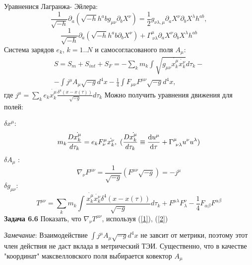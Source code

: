 \documentclass[a4paper]{article}
\begin{document}
Уравненися Лагранжа- Эйлера:
\begin{equation}
\frac{1}{\sqrt{-h}} \partial_a (\sqrt{-h} h^ab g_{\mu \nu} \partial_b X^\nu) =\frac{1}{2} g_{\nu \lambda, \mu} \partial_a X^\nu \partial_b X^\lambda h^{ab},
\end{equation}
\begin{equation}
\frac{1}{\sqrt{-h}} \partial_a (\sqrt{-h} h^ab  \partial_b X^\nu) + \Gamma^{\mu}_{{~} \nu \lambda} \partial_a X^\nu \partial_b X^\lambda h^{ab} 
\end{equation}
Система зарядов $e_k$, $k=1..N$ и самосогласованого поля $A_\mu$:
\begin{align}
S  = S_m + S_{int} +S_F = - \sum_k m_k \int \sqrt{g_{\mu \nu} \dot{x^\mu_k} \dot{x^\nu_k}} d\tau_k - \\
  \nonumber
- \int j^\mu A_\mu \sqrt{-g} d^4x - \frac{1}{4} \int F_{\mu \nu} F^{\mu \nu} \sqrt{-g} d^4 x,
\end{align}
где $j^\mu = \sum_k e_k \dot{x_k^\mu} \frac{\delta^4(x - x(\tau))}{\sqrt{-g}} d\tau_k$ Можно получить уравнения движения для полей:
\par 
$\delta x^\mu$: 
\begin{equation}
\label{1}
m_k \frac{D \dot{x^\mu_k}}{d\tau_k} = e_k F^\mu_\nu \dot{x^\nu_k},  {~} (\frac{D \dot{x^\mu_k}}{d\tau_k} \equiv \dv{u^\mu}{\tau} + \Gamma^{\mu}_{{~} \nu \lambda} u^{\nu} u^{\lambda})
\end{equation}
$\delta A_\mu$ :
\begin{equation}
\nabla_\nu F^{\mu \nu} = \frac{1}{\sqrt{-g}} (F^{\mu \nu} \sqrt{-g}) = - j^\mu  \label{2}
\end{equation}
$\delta g_{\mu \nu}:$
\begin{equation}
T^{\mu \nu} =\sum_k m_k \int\frac{\dot{x^\mu_k} \dot{x^\nu_k} \delta^4(x - x(\tau))}{\sqrt{-g}} d\tau_k + F^{\mu \lambda} F_\lambda^\nu  - \frac{1}{4} F_{\alpha \beta} F^{\alpha \beta}
\end{equation}
\textbf{Задача 6.6} Показать, что $\nabla_\nu T^{\mu \nu}$, используя (\ref{1}), (\ref{2})
\par 
\textit{Замечание}: Взаимодействие $\int j^\mu A_\mu \sqrt{-g} d^4x $ не завсит от метрики, поэтому этот член действия не даст вклада в метрический ТЭИ. Существенно, что в качестве "координат" максвелловского поля выбирается ковектор $A_\mu$
\end{document}
